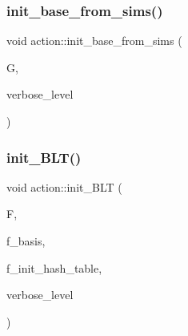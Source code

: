 \mbox{\label{classaction_a3af19dd4cf854ee26d53409cd4762d3f}} 
\subsubsection{\texorpdfstring{init\+\_\+base\+\_\+from\+\_\+sims()}{init\_base\_from\_sims()}}
{\footnotesize\ttfamily void action\+::init\+\_\+base\+\_\+from\+\_\+sims (\begin{DoxyParamCaption}\item[{\mbox{\hyperlink{classsims}{sims}} $\ast$}]{G,  }\item[{\mbox{\hyperlink{galois_8h_a09fddde158a3a20bd2dcadb609de11dc}{I\+NT}}}]{verbose\+\_\+level }\end{DoxyParamCaption})}

\mbox{\label{classaction_a0d33ca0ebe7467b984c3058520e02a0c}} 
\subsubsection{\texorpdfstring{init\+\_\+\+B\+L\+T()}{init\_BLT()}}
{\footnotesize\ttfamily void action\+::init\+\_\+\+B\+LT (\begin{DoxyParamCaption}\item[{\mbox{\hyperlink{classfinite__field}{finite\+\_\+field}} $\ast$}]{F,  }\item[{\mbox{\hyperlink{galois_8h_a09fddde158a3a20bd2dcadb609de11dc}{I\+NT}}}]{f\+\_\+basis,  }\item[{\mbox{\hyperlink{galois_8h_a09fddde158a3a20bd2dcadb609de11dc}{I\+NT}}}]{f\+\_\+init\+\_\+hash\+\_\+table,  }\item[{\mbox{\hyperlink{galois_8h_a09fddde158a3a20bd2dcadb609de11dc}{I\+NT}}}]{verbose\+\_\+level }\end{DoxyParamCaption})}

\mbox{\label{classaction_a3b9287d084b24f7a3b9532a7589c58de}} 
